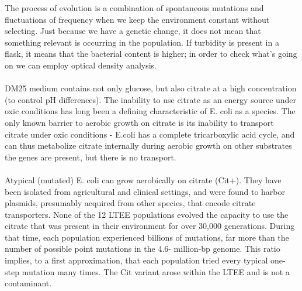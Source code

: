 \noindent
The process of evolution is a combination of spontaneous mutations and fluctuations of frequency when we keep the environment constant without selecting. Just because we have a genetic change, it does not mean that something relevant is occurring in the population. If turbidity is present in a flask, it means that the bacterial content is higher; in order to check what’s going on we can employ optical density analysis.
\\
\\
\noindent
DM25 medium contains not only glucose, but also citrate at a high concentration (to control pH differences). The inability to use citrate as an energy source under oxic conditions has long been a defining characteristic of E. coli as a species. The only known barrier to aerobic growth on citrate is its inability to transport citrate under oxic conditions - E.coli has a complete tricarboxylic acid cycle, and can thus metabolize citrate internally during aerobic growth on other substrates the genes are present, but there is no transport.
\\
\\
\noindent
Atypical (mutated) E. coli can grow aerobically on citrate (Cit+). They have been isolated from agricultural and clinical settings, and were found to harbor plasmids, presumably acquired from other species, that encode citrate transporters. None of the 12 LTEE populations evolved the capacity to use the citrate that was present in their environment for over 30,000 generations. During that time, each population experienced billions of mutations, far more than the number of possible point mutations in the 4.6- million-bp genome. This ratio implies, to a first approximation, that each population tried every typical one-step mutation many times. 
The Cit variant arose within the LTEE and is not a contaminant. 

